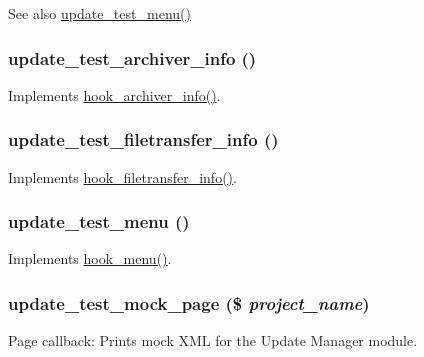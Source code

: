 \begin{DoxySeeAlso}{See also}
\hyperlink{update__test_8module_a65e97dbd4657523edc1297af8ddc1f51}{update\_\-test\_\-menu()} 
\end{DoxySeeAlso}
\hypertarget{update__test_8module_a17d36d1dea641f2164236e67bdf55ba9}{
\subsubsection[{update\_\-test\_\-archiver\_\-info}]{\setlength{\rightskip}{0pt plus 5cm}update\_\-test\_\-archiver\_\-info ()}}
\label{update__test_8module_a17d36d1dea641f2164236e67bdf55ba9}
Implements \hyperlink{group__hooks_ga1c5bd8d11e7d54242528f85434e5b260}{hook\_\-archiver\_\-info()}. \hypertarget{update__test_8module_a3d75c6d974fa7f93b4d757a82770b0d6}{
\subsubsection[{update\_\-test\_\-filetransfer\_\-info}]{\setlength{\rightskip}{0pt plus 5cm}update\_\-test\_\-filetransfer\_\-info ()}}
\label{update__test_8module_a3d75c6d974fa7f93b4d757a82770b0d6}
Implements \hyperlink{group__hooks_gacecdedb61704444382417e6ec8da240d}{hook\_\-filetransfer\_\-info()}. \hypertarget{update__test_8module_a65e97dbd4657523edc1297af8ddc1f51}{
\subsubsection[{update\_\-test\_\-menu}]{\setlength{\rightskip}{0pt plus 5cm}update\_\-test\_\-menu ()}}
\label{update__test_8module_a65e97dbd4657523edc1297af8ddc1f51}
Implements \hyperlink{group__hooks_ga5c95244fea59b25666e409759e133ded}{hook\_\-menu()}. \hypertarget{update__test_8module_a6eed92d3171b2d720e224dc09979fe59}{
\subsubsection[{update\_\-test\_\-mock\_\-page}]{\setlength{\rightskip}{0pt plus 5cm}update\_\-test\_\-mock\_\-page (\$ {\em project\_\-name})}}
\label{update__test_8module_a6eed92d3171b2d720e224dc09979fe59}
Page callback: Prints mock XML for the Update Manager module.

